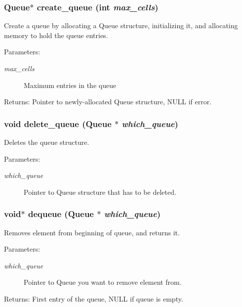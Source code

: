 \subsubsection{\setlength{\rightskip}{0pt plus 5cm}\bf{Queue}$\ast$ create\_\-queue (int {\em max\_\-cells})}\label{queue_8c_b710f6637419a761df20688da7ece206}


Create a queue by allocating a Queue structure, initializing it, and allocating memory to hold the queue entries. \begin{Desc}
\item[Parameters:]
\begin{description}
\item[{\em max\_\-cells}]Maximum entries in the queue \end{description}
\end{Desc}
\begin{Desc}
\item[Returns:]Pointer to newly-allocated Queue structure, NULL if error. \end{Desc}
\subsubsection{\setlength{\rightskip}{0pt plus 5cm}void delete\_\-queue (\bf{Queue} $\ast$ {\em which\_\-queue})}\label{queue_8c_59e6e61741ed251ed46a6a38990c24b0}


Deletes the queue structure. \begin{Desc}
\item[Parameters:]
\begin{description}
\item[{\em which\_\-queue}]Pointer to Queue structure that has to be deleted. \end{description}
\end{Desc}
\subsubsection{\setlength{\rightskip}{0pt plus 5cm}void$\ast$ dequeue (\bf{Queue} $\ast$ {\em which\_\-queue})}\label{queue_8c_a150371d99ffab3f34b09efa4669a47b}


Removes element from beginning of queue, and returns it. \begin{Desc}
\item[Parameters:]
\begin{description}
\item[{\em which\_\-queue}]Pointer to Queue you want to remove element from. \end{description}
\end{Desc}
\begin{Desc}
\item[Returns:]First entry of the queue, NULL if queue is empty. \end{Desc}
